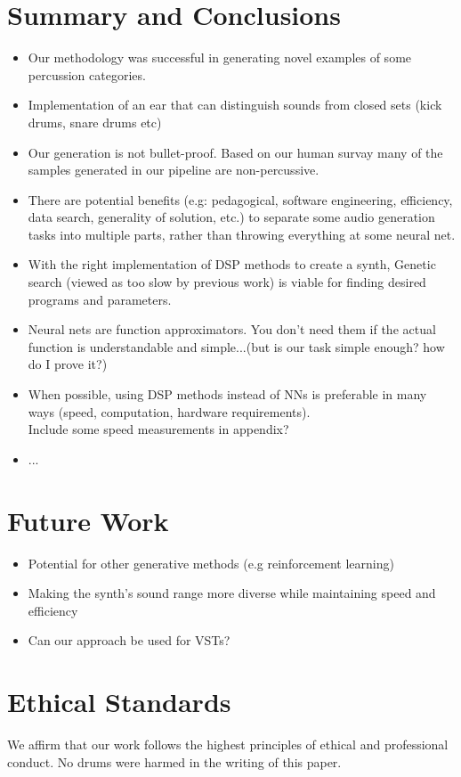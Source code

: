 \documentclass{nime-alternate} %
\begin{document}
\section{Summary and Conclusions}

\begin{itemize}
    \item Our methodology was successful in generating novel examples of some percussion categories.
    \item Implementation of an ear that can distinguish sounds from closed sets (kick drums, snare drums etc)
    \item Our generation is not bullet-proof. Based on our human survay many of the samples generated in our pipeline are non-percussive. 
    \item There are potential benefits (e.g: pedagogical, software engineering, efficiency, data search, generality of solution, etc.) to separate some audio generation tasks into multiple parts, rather than throwing everything at some neural net. 
    \item With the right implementation of DSP methods to create a synth, Genetic search (viewed as too slow by previous work) is viable for finding desired programs and parameters.
    \item Neural nets are function approximators. You don't need them if the actual function is understandable and simple...(but is our task simple enough? how do I prove it?)
    \item When possible, using DSP methods instead of NNs is preferable in many ways (speed, computation, hardware requirements).\\
    \colorbox{green!=30}{Include some speed measurements in appendix?}
    \item ...
\end{itemize}
\section{Future Work}
\begin{itemize}
    \item Potential for other generative methods (e.g reinforcement learning)
    \item Making the synth's sound range more diverse while maintaining speed and efficiency
    \item Can our approach be used for VSTs?
\end{itemize}

\section{Ethical Standards}
We affirm that our work follows the highest principles of ethical and professional conduct. No drums were harmed in the writing of this paper.

     
\end{document}
